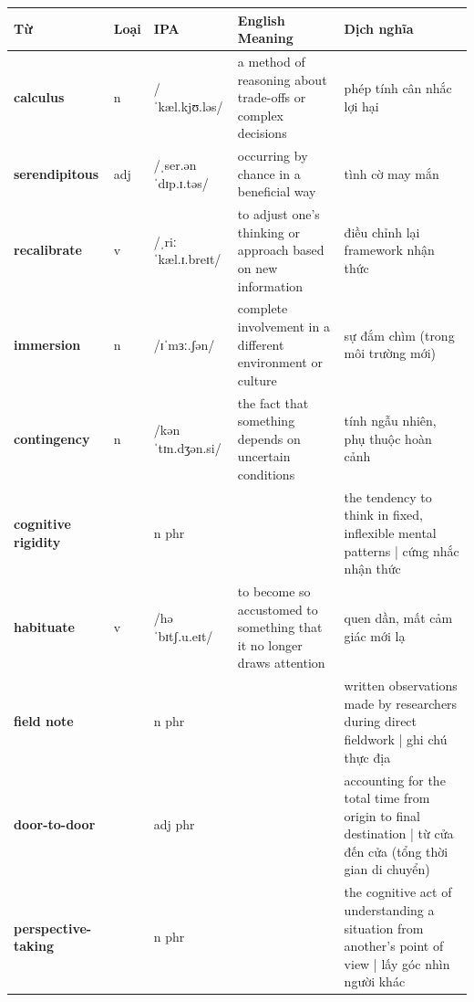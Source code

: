 \vspace{0.8em}
\begin{center}
\renewcommand{\arraystretch}{1.65}
\begin{tabularx}{\textwidth}{|V{0.22\textwidth}|C{0.07\textwidth}|I{0.20\textwidth}|Y|V{0.18\textwidth}|}
\hline
{}
\textbf{Từ} & \textbf{Loại} & \textbf{IPA} & \textbf{English Meaning} & \textbf{Dịch nghĩa} \\
\hline
\textbf{calculus} & n & /ˈkæl.kjʊ.ləs/ & a method of reasoning about trade-offs or complex decisions & phép tính cân nhắc lợi hại \\ \hline
\textbf{serendipitous} & adj & /ˌser.ənˈdɪp.ɪ.təs/ & occurring by chance in a beneficial way & tình cờ may mắn \\ \hline
\textbf{recalibrate} & v & /ˌriːˈkæl.ɪ.breɪt/ & to adjust one's thinking or approach based on new information & điều chỉnh lại framework nhận thức \\ \hline
\textbf{immersion} & n & /ɪˈmɜː.ʃən/ & complete involvement in a different environment or culture & sự đắm chìm (trong môi trường mới) \\ \hline
\textbf{contingency} & n & /kənˈtɪn.dʒən.si/ & the fact that something depends on uncertain conditions & tính ngẫu nhiên, phụ thuộc hoàn cảnh \\ \hline
\textbf{cognitive rigidity} & & n phr & & the tendency to think in fixed, inflexible mental patterns | cứng nhắc nhận thức \\ \hline
\textbf{habituate} & v & /həˈbɪtʃ.u.eɪt/ & to become so accustomed to something that it no longer draws attention & quen dần, mất cảm giác mới lạ \\ \hline
\textbf{field note} & & n phr & & written observations made by researchers during direct fieldwork | ghi chú thực địa \\ \hline
\textbf{door-to-door} & & adj phr & & accounting for the total time from origin to final destination | từ cửa đến cửa (tổng thời gian di chuyển) \\ \hline
\textbf{perspective-taking} & & n phr & & the cognitive act of understanding a situation from another's point of view | lấy góc nhìn người khác \\ \hline
\end{tabularx}
\end{center}

\newpage

